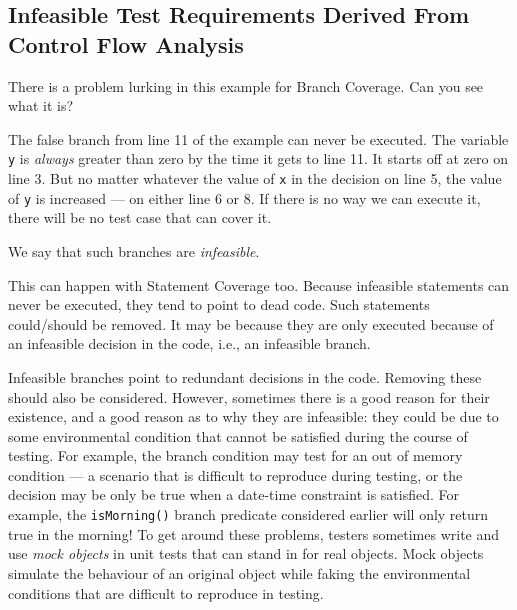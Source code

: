 
\subsection{Infeasible Test Requirements Derived From Control Flow Analysis} 

There is a problem lurking in this example for Branch Coverage. Can you see what
it is?




The false branch from line 11 of the example can never be executed. The variable
{\tt y} is {\it always} greater than zero by the time it gets to line 11. It
starts off at zero on line 3. But no matter whatever the value of {\tt x} in the
decision on line 5, the value of {\tt y} is increased --- on either line 6 or 8.
If there is no way we can execute it, there will be no test case that can cover
it.

We say that such branches are {\it infeasible}. 



This can happen with Statement Coverage too. Because infeasible statements can
never be executed, they tend to point to dead code. Such statements could/should
be removed. It may be because they are only executed because of an infeasible
decision in the code, i.e., an infeasible branch.


Infeasible branches point to redundant decisions in the code. Removing these
should also be considered. However, sometimes there is a good reason for their
existence, and a good reason as to why they are infeasible: they could be due to
some environmental condition that cannot be satisfied during the course of
testing. For example, the branch condition may test for an out of memory
condition --- a scenario that is difficult to reproduce during testing, or the
decision may be only be true when a date-time constraint is satisfied. For
example, the {\tt isMorning()} branch predicate considered earlier will only
return true in the morning! To get around these problems, testers sometimes
write and use {\it mock objects} in unit tests that can stand in for real
objects. Mock objects simulate the behaviour of an original object while faking
the environmental conditions that are difficult to reproduce in testing. 

